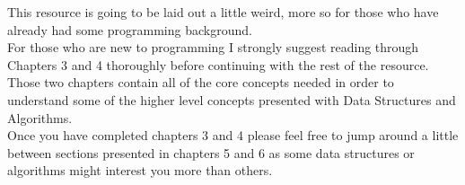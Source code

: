This resource is going to be laid out a little weird, more so for those who have already had some programming background.
\newline
\\

For those who are new to programming I strongly suggest reading through Chapters 3 and 4 thoroughly before continuing with the
rest of the resource. Those two chapters contain all of the core concepts needed in order to understand some of the higher level
concepts presented with Data Structures and Algorithms.
\newline
\\

Once you have completed chapters 3 and 4 please feel free to jump around a little between sections presented in chapters 5 and 6 as
some data structures or algorithms might interest you more than others.
